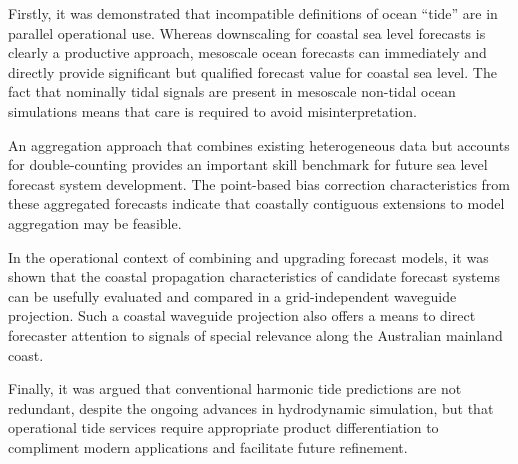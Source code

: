 Firstly, it was demonstrated that incompatible definitions of ocean ``tide'' are in parallel operational use.
Whereas downscaling for coastal sea level forecasts is clearly a productive approach, mesoscale ocean forecasts can immediately and directly provide significant but qualified forecast value for coastal sea level.
The fact that nominally tidal signals are present in mesoscale non-tidal ocean simulations means that care is required to avoid misinterpretation.

An aggregation approach that combines existing heterogeneous data but accounts for double-counting provides an important skill benchmark for future sea level forecast system development.
The point-based bias correction characteristics from these aggregated forecasts indicate that coastally contiguous extensions to model aggregation may be feasible.


In the operational context of combining and upgrading forecast models, it was shown that the coastal propagation characteristics of candidate forecast systems can be usefully evaluated and compared in a grid-independent waveguide projection.
Such a coastal waveguide projection also offers a means to direct forecaster attention to signals of special relevance along the Australian mainland coast.

Finally, it was argued that conventional harmonic tide predictions are not redundant, despite the ongoing advances in hydrodynamic simulation,  but that operational tide services require appropriate product differentiation to compliment modern applications and facilitate future refinement.
